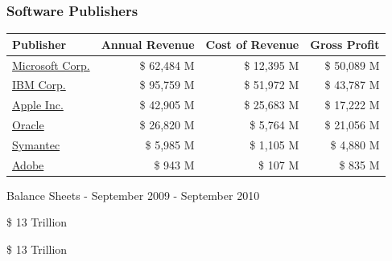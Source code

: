 \documentclass[18pt]{beamer}
\begin{document}
\begin{frame}
\frametitle{Software Publishers}

\begin{tabular}{lrrr}
\hline
\textbf{Publisher} &	\textbf{Annual Revenue} & \textbf{Cost of Revenue} & \textbf{Gross Profit} \\
\hline
\hline
\href{http://www.google.com/finance?fstype=ii\&q=NASDAQ:MSFT}{Microsoft Corp.}	& \$ 62,484 M & \$ 12,395 M  & \$ 50,089 M  \\
\hline
\href{http://www.google.com/finance?q=NYSE:IBM\&fstype=ii}{IBM Corp.} & \$ 95,759 M & \$ 51,972 M & \$ 43,787 M \\
\hline
\href{http://www.google.com/finance?q=NASDAQ:AAPL\&fstype=ii}{Apple Inc.} & \$ 42,905 M & \$ 25,683 M & \$ 17,222 M \\
\hline
\href{http://www.google.com/finance?q=NASDAQ:ORCL\&fstype=ii}{Oracle} & \$ 26,820 M & \$ 5,764 M & \$ 21,056 M \\
\hline
\href{http://www.google.com/finance?q=NASDAQ:SYMC\&fstype=ii}{Symantec}	&	\$ 5,985 M & \$ 1,105 M & \$ 4,880 M \\
\hline
\href{http://www.google.com/finance?q=NASDAQ:ADBE\&fstype=ii}{Adobe} & \$ 943 M & \$ 107 M & \$ 835 M \\
\hline
\end{tabular}

\bigskip
\begin{center}
Balance Sheets - September 2009 - September 2010
\end{center}

\end{frame}


{
\begin{frame}[plain]
\fontsize{72pt}{90pt}\selectfont
\center
\begin{center}
\$ 13 Trillion
\end{center}
\end{frame}
}

{
\begin{frame}[plain]
\fontsize{72pt}{90pt}\selectfont
\center
\begin{center}
\$ 13 Trillion
\end{center}
\end{frame}
}
\end{document}
